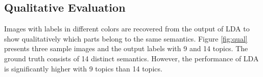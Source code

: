 \documentclass{acm_proc_article-sp}
\begin{document}
\subsection{Qualitative Evaluation}
Images with labels in different colors are recovered from the output of LDA to show qualitatively which parts belong to the same semantics. Figure \ref{fig:qual} presents three sample images and the output labels with 9 and 14 topics. The ground truth consists of 14 distinct semantics. However, the performance of LDA is significantly higher with 9 topics than 14 topics.
\begin{figure}[!htb]
\centering
{}
\end{figure}
\end{document}
